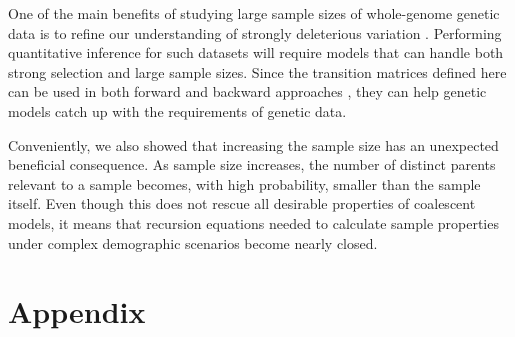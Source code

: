 \documentclass[review,nonatbib]{elsarticle}
\begin{document}



One of the main benefits of studying large sample sizes of whole-genome genetic data is to refine
our understanding of strongly deleterious variation \cite{karczewski2020mutational}. Performing
quantitative inference for such datasets will require models that can handle both strong selection
and large sample sizes.  Since the transition matrices defined here can be used in both forward
\citep{JouganousEtAl2017} and backward approaches \cite{KammEtAl2017}, they can help genetic models
catch up with the requirements of genetic data.

Conveniently, we also showed that increasing the sample size has an unexpected beneficial consequence.
As sample size increases, the number of distinct parents relevant to a sample becomes,
with high probability, smaller than the sample itself. Even though this does not rescue
all desirable properties of coalescent models, it means that recursion equations
needed to calculate sample properties under complex demographic scenarios become nearly closed. 




\printbibliography

\section{Appendix}

\newcommand{\beginsupplement}{%
        \setcounter{table}{0}
        \renewcommand{\thetable}{S\arabic{table}}%
        \setcounter{figure}{0}
        \renewcommand{\thefigure}{S\arabic{figure}}%
     }
\beginsupplement
\end{document}
